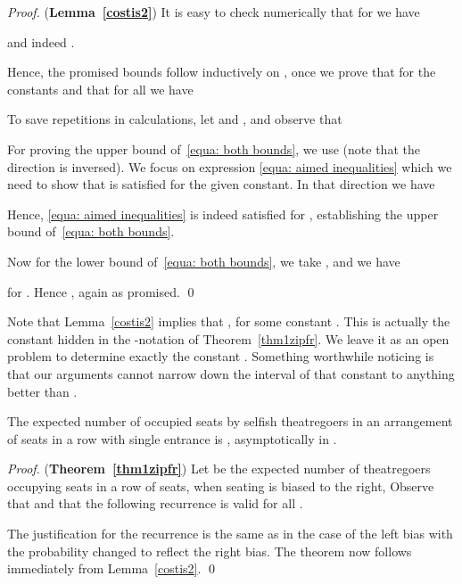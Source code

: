 \documentclass[11pt]{llncs}
\begin{document}
\begin{proof} ({\bf Lemma~\ref{costis2}})
It is easy to check numerically that for  we have

and indeed .

Hence, the promised bounds follow inductively on , once we prove that for the constants  and that for all  we have


To save repetitions in calculations, let  and , and observe that 



For proving the upper bound of~\eqref{equa: both bounds}, we use  (note that the direction is inversed). We focus on expression \eqref{equa: aimed inequalities} which we need to show that is satisfied for the given constant. In that direction we have

Hence, \eqref{equa: aimed inequalities} is indeed satisfied for , establishing  the upper bound of~\eqref{equa: both bounds}.

Now for the lower bound of~\eqref{equa: both bounds}, we take  , and we have 

for . Hence , again as promised. 
\qed
\end{proof}



Note that Lemma~\ref{costis2} implies that , 
for some constant . This is actually the constant hidden in the -notation of Theorem~\ref{thm1zipfr}. We leave it as an open problem to determine exactly the constant . Something worthwhile noticing is that our arguments cannot narrow down the interval of that constant to anything better than .



\begin{theorem}
\label{thm1zipfr}
The expected number of occupied seats by selfish theatregoers
in an arrangement of  seats
in a row with single entrance is , 
asymptotically in .
\end{theorem}
\begin{proof} ({\bf Theorem~\ref{thm1zipfr}})
Let  be the expected number of theatregoers occupying seats 
in a row of  seats,
when seating is biased to the right,
Observe that  and that the following recurrence is valid
for all .

The justification for the recurrence is the same as in the case of the left bias with
the probability changed to reflect the right bias. The theorem now follows immediately
from Lemma~\ref{costis2}. 
\qed
\end{proof}
\end{document}
